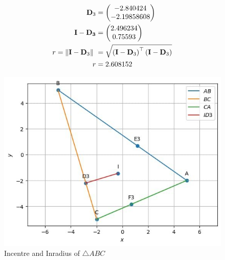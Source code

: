 \documentclass[11pt]{book}
\begin{document}
\begin{enumerate}[label=\thesection.\arabic*.,ref=\thesection.\theenumi]
\begin{enumerate}
\begin{align}
       \vec{D}_3 &= \myvec{-2.840424  \\ -2.19858608} \\
       \vec{I - D_3} &= \myvec{2.496234 \\0.75593} \\
 r= \norm{\vec{I}-\vec{D}_3}\ &=  \sqrt{\brak{\vec{I}-\vec{D}_3}^{\top}\brak{\vec{I}-\vec{D}_3}} \\
 r &= 2.608152
   \end{align}
\end{enumerate}
\begin{figure}[H]
\includegraphics[width=\columnwidth]{figs/2000.jpg}
\caption{Incentre and Inradius of $\triangle ABC$}
\label{fig:fig2}
\end{figure}


\end{enumerate}
\end{document}
